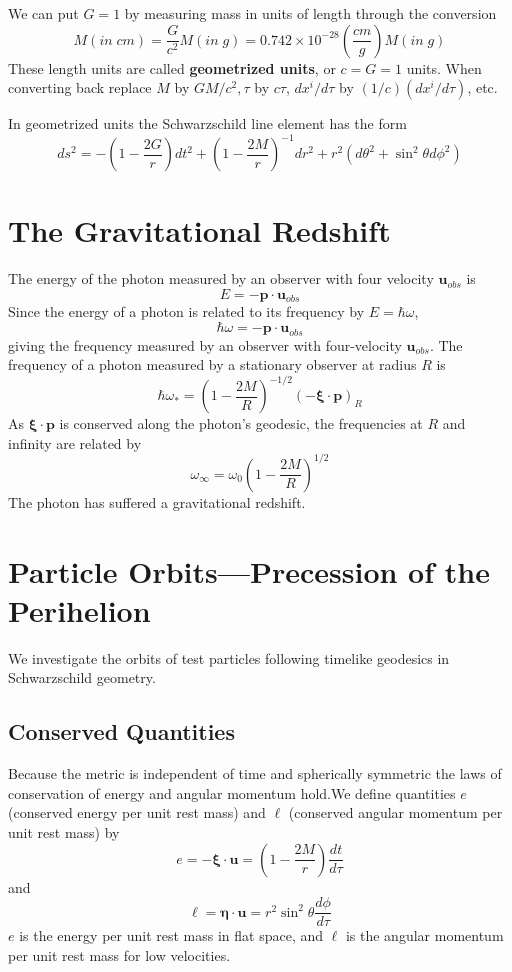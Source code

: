 We can put $G = 1$ by measuring mass in units of length through the conversion $$M(in\;cm) = \frac{G}{c^2}M(in\;g) = 0.742\times 10^{-28}\left(\frac{cm}{g}\right)M(in\;g)$$
These length units are called \textbf{geometrized units}, or $c = G = 1$ units. When converting back replace $M$ by $GM/c^2, \tau$ by $c\tau$, $dx^i/d\tau$ by $(1/c)(dx^i/d\tau)$, etc.

In geometrized units the Schwarzschild line element has the form $$ds^2 = -\left(1-\frac{2G}{r}\right)dt^2+\left(1-\frac{2M}{r}\right)^{-1}dr^2+r^2(d\theta^2+\sin^2\theta d\phi^2)$$


\section{The Gravitational Redshift}
\label{sec:redShiftGrav}

The energy of the photon measured by an observer with four velocity $\mathbf{u}_{obs}$ is $$E = -\mathbf{p}\cdot\mathbf{u}_{obs}$$
Since the energy of a photon is related to its frequency by $E = \hbar\omega$, $$\hbar\omega = -\mathbf{p}\cdot\mathbf{u}_{obs}$$
giving the frequency measured by an observer with four-velocity $\mathbf{u}_{obs}$. The frequency of a photon measured by a stationary observer at radius $R$ is \begin{equation*}
    \hbar\omega_* = \left(1-\frac{2M}{R}\right)^{-1/2}(-\mathbf{\xi}\cdot\mathbf{p})_R
\end{equation*}
As $\mathbf{\xi}\cdot\mathbf{p}$ is conserved along the photon's geodesic, the frequencies at $R$ and infinity are related by $$\omega_{\infty} = \omega_0\left(1-\frac{2M}{R}\right)^{1/2}$$
The photon has suffered a gravitational redshift.



\section{Particle Orbits---Precession of the Perihelion}
\label{sec:perihelion}


We investigate the orbits of test particles following timelike geodesics in Schwarzschild geometry.


\subsection{Conserved Quantities}

Because the metric is independent of time and spherically symmetric the laws of conservation of energy and angular momentum hold.We define quantities $e$ (conserved energy per unit rest mass) and $\ell$ (conserved angular momentum per unit rest mass) by \begin{equation*}
    \boxed{e = -\mathbf{\xi}\cdot\mathbf{u} = \left(1-\frac{2M}{r}\right)\frac{dt}{d\tau}}
\end{equation*}
and \begin{equation*}
    \boxed{\ell = \mathbf{\eta}\cdot\mathbf{u} = r^2\sin^2\theta\frac{d\phi}{d\tau}}
\end{equation*}
$e$ is the energy per unit rest mass in flat space, and $\ell$ is the angular momentum per unit rest mass for low velocities.

